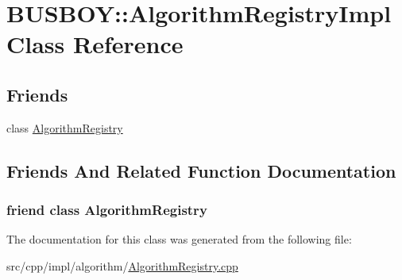 \hypertarget{classBUSBOY_1_1AlgorithmRegistryImpl}{
\section{BUSBOY::AlgorithmRegistryImpl Class Reference}
\label{classBUSBOY_1_1AlgorithmRegistryImpl}
}
\subsection*{Friends}
\begin{DoxyCompactItemize}
\item 
class \hyperlink{classBUSBOY_1_1AlgorithmRegistryImpl_ad2a9f074bb88c9cbc9000bd144a96ab4}{AlgorithmRegistry}
\end{DoxyCompactItemize}


\subsection{Friends And Related Function Documentation}
\hypertarget{classBUSBOY_1_1AlgorithmRegistryImpl_ad2a9f074bb88c9cbc9000bd144a96ab4}{
\subsubsection[{AlgorithmRegistry}]{\setlength{\rightskip}{0pt plus 5cm}friend class {\bf AlgorithmRegistry}}}
\label{classBUSBOY_1_1AlgorithmRegistryImpl_ad2a9f074bb88c9cbc9000bd144a96ab4}


The documentation for this class was generated from the following file:\begin{DoxyCompactItemize}
\item 
src/cpp/impl/algorithm/\hyperlink{AlgorithmRegistry_8cpp}{AlgorithmRegistry.cpp}\end{DoxyCompactItemize}
